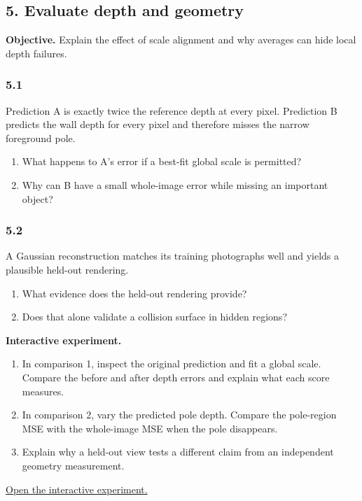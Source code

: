 \documentclass[11pt,a4paper]{article}
\begin{document}
\subsection*{5. Evaluate depth and geometry}
\noindent\textbf{Objective.} Explain the effect of scale alignment and why averages can hide local depth failures.
\par
\noindent
\begin{minipage}{\linewidth}
\subsubsection*{5.1}
Prediction A is exactly twice the reference depth at every pixel.
Prediction B predicts the wall depth for every pixel and therefore misses the narrow foreground pole.
\begin{enumerate}[label=(\alph*),nosep]
\item What happens to A's error if a best-fit global scale is permitted?
\item Why can B have a small whole-image error while missing an important object?
\end{enumerate}
\end{minipage}
\par\medskip
\par
\noindent
\begin{minipage}{\linewidth}
\subsubsection*{5.2}
A Gaussian reconstruction matches its training photographs well and yields a plausible held-out rendering.
\begin{enumerate}[label=(\alph*),nosep]
\item What evidence does the held-out rendering provide?
\item Does that alone validate a collision surface in hidden regions?
\end{enumerate}
\end{minipage}
\par\medskip
\noindent\textbf{Interactive experiment.}
\begin{enumerate}[nosep]
\item In comparison 1, inspect the original prediction and fit a global scale.
Compare the before and after depth errors and explain what each score measures.
\item In comparison 2, vary the predicted pole depth.
Compare the pole-region MSE with the whole-image MSE when the pole disappears.
\item Explain why a held-out view tests a different claim from an independent geometry measurement.
\end{enumerate}
\noindent\href{https://sosekie.github.io/Unibe-CVG-CV-Interactive-Labs/tutorial-10/#evaluation}{Open the interactive experiment.}
\end{document}

